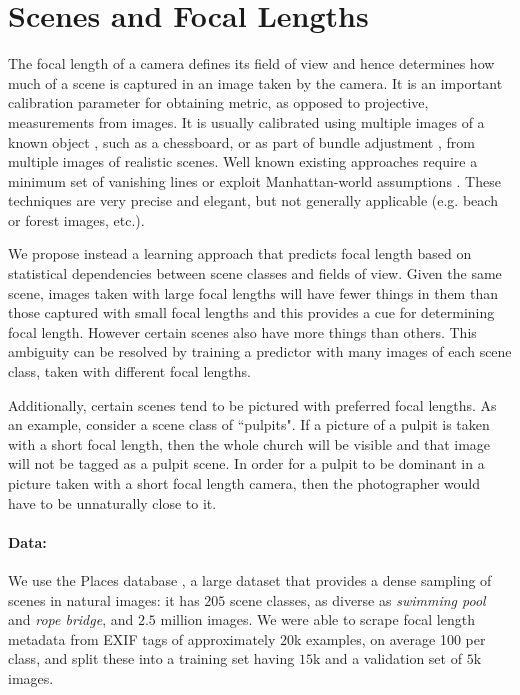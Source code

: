 \section{Scenes and Focal Lengths}
The focal length of a camera defines its field of view and hence determines how much of a scene is captured in an image taken by the camera. It is an important calibration parameter for obtaining metric, as opposed to projective, measurements from images. It is usually calibrated using multiple images of a known object \cite{zhang2000flexible}, such as a chessboard, or as part of bundle adjustment \cite{triggs2000bundle}, from multiple images of realistic scenes. Well known existing approaches require a minimum set of vanishing lines  \cite{wang1991camera} or exploit Manhattan-world assumptions \cite{caprile1990using}. These techniques are very precise and elegant, but not generally applicable (e.g. beach or forest images, etc.).

We propose instead a learning approach that predicts focal length based on statistical dependencies between scene classes and fields of view. Given the same scene, images taken with large focal lengths will have fewer things in them than those captured with small focal lengths and this provides a cue for determining focal length. However certain scenes also have more things than others. This ambiguity can be resolved by training a predictor with many images of each scene class, taken with different focal lengths. 

Additionally, certain scenes tend to be pictured with preferred focal lengths. As an example, consider a scene class of ``pulpits". If a picture of a pulpit is taken with a short focal length, then the whole church will be visible and that image will not be tagged as a pulpit scene. In order for a pulpit to be dominant in a picture taken with a short focal length camera, then the photographer would have to be unnaturally close to it. 

\paragraph{Data:} We use the Places database \cite{zhou2014learning}, a large dataset that provides a dense sampling of scenes in natural images: it has $205$ scene classes, as diverse as \textit{swimming pool} and \textit{rope bridge}, and $2.5$ million images. We were able to scrape focal length metadata from EXIF tags of approximately $20$k examples, on average 100 per class, and split these into a training set having $15$k and a validation set of $5$k images. 

